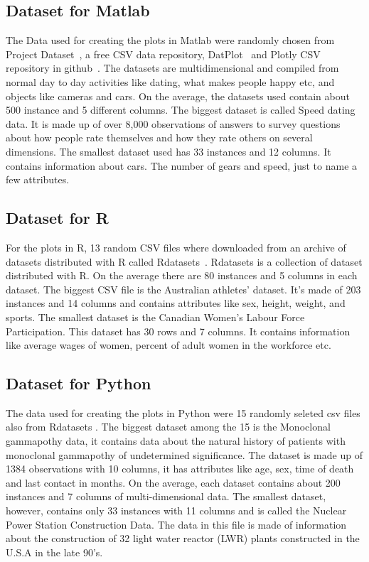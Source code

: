 \documentclass[12pt, a4paper,oneside]{report}
\begin{document}
\subsection{Dataset for Matlab}
The Data used for creating the plots in Matlab were randomly chosen from Project Dataset~\cite{projectdataset}, a free CSV data repository, DatPlot~\cite{datplot} and Plotly CSV repository in github~\cite{plotly}. The datasets are multidimensional and compiled from normal day to day activities like dating, what makes people happy etc, and objects like cameras and cars. On the average, the datasets used contain about 500 instance and 5 different columns. The biggest dataset is called Speed dating data. It is made up of over 8,000 observations of answers to survey questions about how people rate themselves and how they rate others on several dimensions. The smallest dataset used has 33 instances and 12 columns. It contains information about cars. The number of gears and speed, just to name a few attributes.

\subsection{Dataset for R}
For the plots in R, 13 random CSV files where downloaded from an archive of datasets distributed with R called Rdatasets~\cite{rdata}. Rdatasets is a collection of dataset distributed with R. On the average there are 80 instances and 5 columns in each dataset. The biggest CSV file is the Australian athletes' dataset. It's made of 203 instances and 14 columns and contains attributes like sex, height, weight, and sports. The smallest dataset is the Canadian Women's Labour Force Participation. This dataset has 30 rows and 7 columns. It contains information like average wages of women, percent of adult women in the workforce etc.


\subsection{Dataset for Python}
The data used for creating the plots in Python were 15 randomly seleted csv files also from  Rdatasets \cite{rdata}. The biggest dataset among the 15 is the Monoclonal gammapothy data, it contains data about the natural history of patients with monoclonal gammapothy of undetermined significance. The dataset is made up of 1384 observations with 10 columns, it has attributes like age, sex, time of death and last contact in months. On the average, each dataset contains about 200 instances and 7 columns of multi-dimensional data. The smallest dataset, however, contains only 33 instances with 11 columns and is called the Nuclear Power Station Construction Data. The data in this file is made of information about the construction of 32 light water reactor (LWR) plants constructed in the U.S.A in the late 90's.
\end{document}
